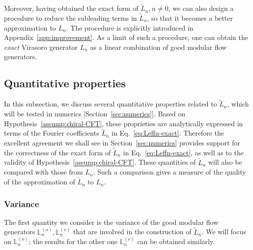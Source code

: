 \documentclass[12pt, nofootinbib]{article}
\theoremstyle{plain}
\theoremstyle{assumption}
\theoremstyle{definition}
\theoremstyle{plain}
\theoremstyle{plain}
\theoremstyle{plain}
\theoremstyle{plain}
\theoremstyle{plain}
\def\Lbe{\mathbb{L}^{(e)}}
\def\Lbo{\mathbb{L}^{(o)}}
\def\Leff{\widetilde{L}}
\begin{document}
Moreover, having obtained the exact form of $\Leff_n,n\neq 0$, we can also design a procedure to reduce the subleading terms in $\Leff_n$, so that it becomes a better approximation to $L_n$. The procedure is explicitly introduced in Appendix~\ref{app:improvement}. As a limit of such a procedure, one can obtain the \emph{exact} Virasoro generator $L_n$ as a linear combination of good modular flow generators. 

\subsection{Quantitative properties}
\label{subsec:quant-properties}
In this subsection, we discuss several quantitative properties related to $\Leff_n$, which will be tested in numerics [Section~\ref{sec:numerics}]. 
Based on Hypothesis~\ref{assump:chiral-CFT},
these proprieties are analytically expressed in terms of the Fourier coefficients $\Leff_n$ in Eq.~\eqref{eq:Leffn-exact}. Therefore the excellent agreement we shall see in Section~\ref{sec:numerics} provides support for the correctness of the exact form of $\Leff_n$ in Eq.~\eqref{eq:Leffn-exact}, as well as to the validity of Hypothesis~\ref{assump:chiral-CFT}. These quantities of $\Leff_n$ will also be compared with those from $L_n$. Such a comparison gives a measure of the quality of the approximation of $\Leff_n$ to $L_n$.

\subsubsection{Variance}
\label{subsubsec:variance}
The first quantity we consider is the variance of the good modular flow generators $\Lbo_n,\Lbe_n$ that are involved in the construction of $\Leff_n$. We will focus on $\Lbo_n$; the results for the other one $\Lbe_n$ can be obtained similarly. 
\end{document}
